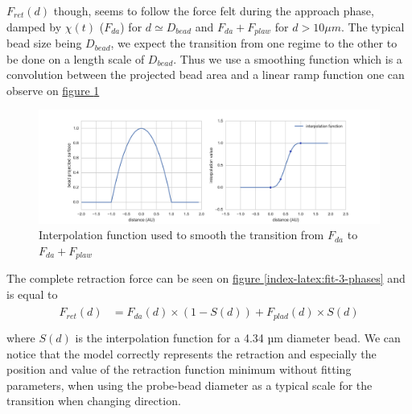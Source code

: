 \documentclass[A4paperpaper,11pt,english]{sphinxmanual}
\begin{document}
\(F_{ret}(d)\) though, seems to follow the force felt during the approach phase,
damped by \(\chi(t)\) (\(F_{da}\)) for \(d\simeq{D_{bead}}\) and
\(F_{da}+F_{plaw}\) for \(d > 10\mu{}m\).  The
typical bead size being \(D_{bead}\), we expect the transition from
one regime to the other to be done on a length scale of \(D_{bead}\). Thus
we use a smoothing function which is a convolution between the projected bead
area and a linear ramp function one can observe on \hyperref[index-latex:interp]{figure  \ref*{index-latex:interp}}
\begin{figure}[htbp]
\centering
\capstart

\includegraphics[width=0.900\linewidth]{interpolation.png}
\caption{Interpolation function used to smooth the transition from \(F_{da}\) to
\(F_{da}+F_{plaw}\)}\label{index-latex:interp}\end{figure}

The complete retraction force can be seen on \hyperref[index-latex:fit-3-phases]{figure  \ref*{index-latex:fit-3-phases}} and is equal to
\label{index-latex:equation-eqa314}\begin{gather}
\begin{split}F_{ret}(d) &= F_{da}(d)\times(1-S(d)) + F_{plad}(d)\times S(d)\\\end{split}\label{index-latex-eqa314}
\end{gather}
where \(S(d)\) is the interpolation function for a 4.34 µm
diameter bead. We can notice that the model correctly represents the retraction and especially
the position and value of the retraction function minimum without
fitting parameters, when using the probe-bead diameter as a typical scale
for the transition when changing direction.
\end{document}

